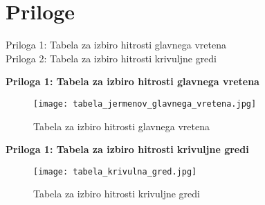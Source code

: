 \newpage

\section{Priloge}

Priloga 1: Tabela za izbiro hitrosti glavnega vretena \\
Priloga 2: Tabela za izbiro hitrosti krivuljne gredi

\newpage

\textbf{\fontsize{14}{21}\selectfont Priloga 1: Tabela za izbiro hitrosti glavnega vretena}
\label{tabela_za_izbiro_hitrosti}
\begin{figure}[H]
	\begin{center}
		\texttt{[image: tabela\_jermenov\_glavnega\_vretena.jpg]}
		\caption{Tabela za izbiro hitrosti glavnega vretena
			\cite{gauthier}}
	\end{center}
\end{figure}

\newpage

\textbf{\fontsize{14}{21}\selectfont Priloga 1: Tabela za izbiro hitrosti krivuljne gredi}
\label{tabela_krivuljna_gred}
\begin{figure}[H]
	\begin{center}
		\texttt{[image: tabela\_krivulna\_gred.jpg]}
		\caption{Tabela za izbiro hitrosti krivuljne gredi
			\cite{gauthier}}
	\end{center}
\end{figure}